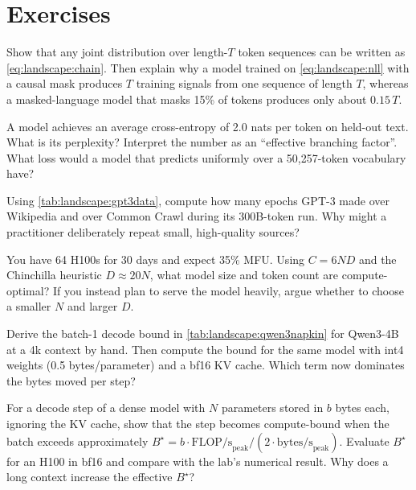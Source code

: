 \section{Exercises}\label{sec:landscape:exercises}

\begin{exercise}
Show that any joint distribution over length-$T$ token sequences can be written as
\eqref{eq:landscape:chain}. Then explain why a model trained on \eqref{eq:landscape:nll} with a causal
mask produces $T$ training signals from one sequence of length $T$, whereas a masked-language model that
masks 15\% of tokens produces only about $0.15\,T$.
\end{exercise}

\begin{exercise}
A model achieves an average cross-entropy of 2.0 nats per token on held-out text. What is its perplexity?
Interpret the number as an ``effective branching factor''. What loss would a model that predicts uniformly
over a 50{,}257-token vocabulary have?
\end{exercise}

\begin{exercise}
Using \cref{tab:landscape:gpt3data}, compute how many epochs GPT-3 made over Wikipedia and over
Common Crawl during its 300B-token run. Why might a practitioner deliberately repeat small, high-quality
sources?
\end{exercise}

\begin{exercise}
You have 64 H100s for 30 days and expect 35\% MFU. Using $C=6ND$ and the Chinchilla heuristic
$D\approx20N$, what model size and token count are compute-optimal? If you instead plan to serve the
model heavily, argue whether to choose a smaller $N$ and larger $D$.
\end{exercise}

\begin{exercise}
Derive the batch-1 decode bound in \cref{tab:landscape:qwen3napkin} for Qwen3-4B at a 4k context by hand.
Then compute the bound for the same model with int4 weights (0.5 bytes/parameter) and a bf16 KV cache.
Which term now dominates the bytes moved per step?
\end{exercise}

\begin{exercise}
For a decode step of a dense model with $N$ parameters stored in $b$ bytes each, ignoring the KV cache,
show that the step becomes compute-bound when the batch exceeds approximately
$B^\star = b\cdot \text{FLOP/s}_{\text{peak}} / (2\cdot\text{bytes/s}_{\text{peak}})$. Evaluate $B^\star$ for an
H100 in bf16 and compare with the lab's numerical result. Why does a long context increase the
effective $B^\star$?
\end{exercise}

